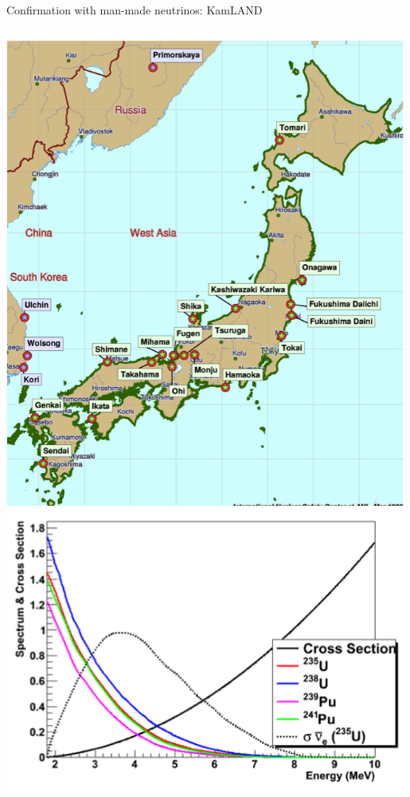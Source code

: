 \begin{frame}[t]{Confirmation with man-made neutrinos: KamLAND}

\vspace{0.1cm}
\begin{columns}
  \begin{column}{0.30\textwidth}
    \centering
    \includegraphics[width=0.99\textwidth]{./images/3nu/reactor/kamLAND_reactors.png}\\
    \includegraphics[width=0.99\textwidth]{./images/3nu/reactor/reactor_flux_xsec_and_rate.png}\\

\end{column}
\end{columns}
\end{frame}
